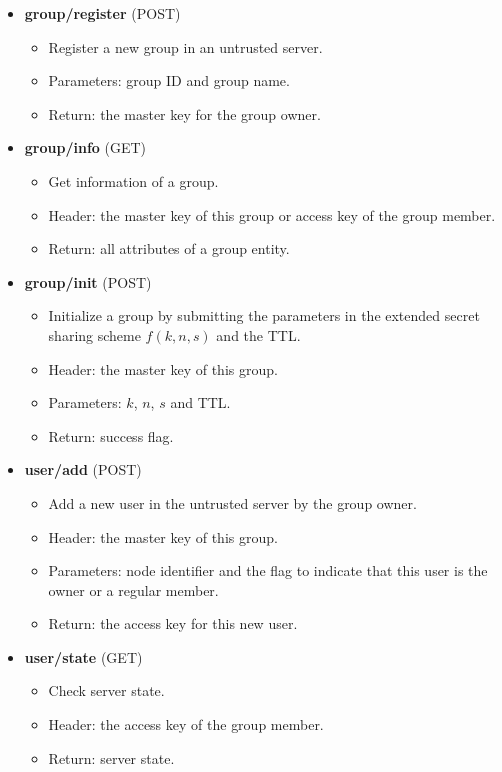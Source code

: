 \documentclass[a4paper,11pt]{report}
\begin{document}
\begin{itemize}[leftmargin=7mm]
	\setlength{\itemsep}{1pt}
	\setlength{\parskip}{0pt}
	\setlength{\parsep}{0pt}
	\item 
	\textbf{group/register} (POST)
	\begin{itemize}
		\item Register a new group in an untrusted server.
		\item Parameters: group ID and group name.
		\item Return: the master key for the group owner. 
	\end{itemize}
	\item 
	\textbf{group/info} (GET)
	\begin{itemize}
		\item Get information of a group.
		\item Header: the master key of this group or access key of the group member.
		\item Return: all attributes of a group entity. 
	\end{itemize}
	\item 
	\textbf{group/init} (POST)
	\begin{itemize}
		\item Initialize a group by submitting the parameters in the extended secret sharing scheme $f(k, n, s)$ and the TTL.
		\item Header: the master key of this group.
		\item Parameters: $k$, $n$, $s$ and TTL.
		\item Return: success flag.
	\end{itemize}
	\item 
	\textbf{user/add} (POST)
	\begin{itemize}
		\item Add a new user in the untrusted server by the group owner.
		\item Header: the master key of this group.
		\item Parameters: node identifier and the flag to indicate that this user is the owner or a regular member.
		\item Return: the access key for this new user.
	\end{itemize}
	\item 
	\textbf{user/state} (GET)
	\begin{itemize}
		\item Check server state.
		\item Header: the access key of the group member.
		\item Return: server state.

\end{itemize}
\end{itemize}
\end{document}
